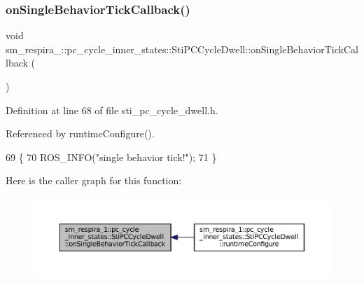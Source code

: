 \subsubsection{\texorpdfstring{on\+Single\+Behavior\+Tick\+Callback()}{onSingleBehaviorTickCallback()}}
{\footnotesize\ttfamily void sm\+\_\+respira\+\_\+::pc\+\_\+cycle\+\_\+inner\+\_\+states\+::\+Sti\+P\+C\+Cycle\+Dwell\+::on\+Single\+Behavior\+Tick\+Callback (\begin{DoxyParamCaption}{ }\end{DoxyParamCaption})\hspace{0.3cm}{\ttfamily [inline]}}



Definition at line 68 of file sti\+\_\+pc\+\_\+cycle\+\_\+dwell.\+h.



Referenced by runtime\+Configure().


\begin{DoxyCode}
69   \{
70     ROS\_INFO(\textcolor{stringliteral}{"single behavior tick!"});
71   \}
\end{DoxyCode}
Here is the caller graph for this function\+:
\nopagebreak
\begin{figure}[H]
\begin{center}
\leavevmode
\includegraphics[width=350pt]{structsm__respira__1_1_1pc__cycle__inner__states_1_1StiPCCycleDwell_a39d69f67f8b5649295ad6a66cc9c0cf8_icgraph}
\end{center}
\end{figure}
\mbox{\label{structsm__respira__1_1_1pc__cycle__inner__states_1_1StiPCCycleDwell_aaa9be342bc58926f91230ab15e4925cc}} 

